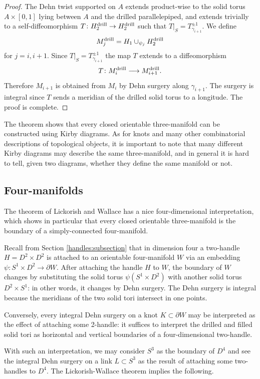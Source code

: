 \begin{proof}
The Dehn twist supported on $A$ extends product-wise to the solid torus $A\times [0,1]$ lying between $A$ and the drilled \iftoggle{BW}{light grey}{yellow} parallelepiped, and extends trivially to a self-diffeomorphism $T\colon H_2^{\rm drill} \to H_2^{\rm drill}$ such that $T|_S = T_{\gamma_{i+1}}^{\pm 1}$. We define
$$M_j^{\rm drill} = H_1 \cup_{\psi_j} H_2^{\rm drill}$$
for $j=i, i+1$. Since $T|_S = T_{\gamma_{i+1}}^{\pm 1}$ the map $T$ extends to a diffeomorphism
$$T\colon M_i^{\rm drill} \longrightarrow M_{i+1}^{\rm drill}.$$
Therefore $M_{i+1}$ is obtained from $M_i$ by Dehn surgery along $\gamma_{i+1}$. The surgery is integral since $T$ sends a meridian of the drilled \iftoggle{BW}{light grey}{yellow} solid torus to a longitude. The proof is complete.
\end{proof}

The theorem shows that every closed orientable three-manifold can be constructed using Kirby diagrams. As for knots and many other combinatorial descriptions of topological objects, it is important to note that many different Kirby diagrams may describe the same three-manifold, and in general it is hard to tell, given two diagrams, whether they define the same manifold or not.

\subsection{Four-manifolds}
The theorem of Lickorish and Wallace has a nice four-dimensional interpretation, which shows in particular that every closed orientable three-manifold is the boundary of a simply-connected four-manifold.

Recall from Section \ref{handles:subsection} that in dimension four a two-handle $H=D^2 \times D^2$ is attached to an orientable four-manifold $W$ via an embedding $\psi\colon S^1 \times D^2 \to \partial W$. After attaching the handle $H$ to $W$, the boundary of $W$ changes by substituting the solid torus $\psi(S^1 \times D^2)$ with another solid torus $D^2 \times S^1$: in other words, it changes by Dehn surgery. The Dehn surgery is integral because the meridians of the two solid tori intersect in one points. 

Conversely, every integral Dehn surgery on a knot $K\subset \partial W$ may be interpreted as the effect of attaching some 2-handle: it suffices to interpret the drilled and filled solid tori as horizontal and vertical boundaries of a four-dimensional two-handle.

With such an interpretation, we may consider $S^3$ as the boundary of $D^4$ and see the integral Dehn surgery on a link $L\subset S^3$ as the result of attaching some two-handles to $D^4$. The Lickorish-Wallace theorem implies the following.

